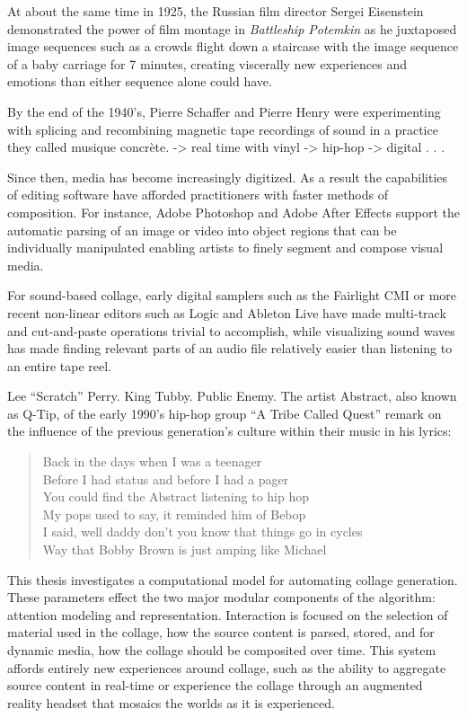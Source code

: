 At about the same time in 1925, the Russian film director Sergei Eisenstein demonstrated the power of film montage in \textit{Battleship Potemkin} as he juxtaposed image sequences such as a crowds flight down a staircase with the image sequence of a baby carriage for 7 minutes, creating viscerally new experiences and emotions than either sequence alone could have.  

By the end of the 1940's, Pierre Schaffer and Pierre Henry were experimenting with splicing and recombining magnetic tape recordings of sound in a practice they called musique concr\`ete.  -> real time with vinyl -> hip-hop -> digital . . .

Since then, media has become increasingly digitized.  As a result the capabilities of editing software have afforded practitioners with faster methods of composition.  For instance, Adobe Photoshop and Adobe After Effects support the automatic parsing of an image or video into object regions that can be individually manipulated enabling artists to finely segment and compose visual media.  

For sound-based collage, early digital samplers such as the Fairlight CMI or more recent non-linear editors such as Logic and Ableton Live have made multi-track and cut-and-paste operations trivial to accomplish, while visualizing sound waves has made finding relevant parts of an audio file relatively easier than listening to an entire tape reel.  

Lee ``Scratch'' Perry.  King Tubby.  Public Enemy.  The artist Abstract, also known as Q-Tip, of the early 1990's hip-hop group ``A Tribe Called Quest'' remark on the influence of the previous generation's culture within their music in his lyrics: 
\begin{quotation}
Back in the days when I was a teenager \\
Before I had status and before I had a pager \\
You could find the Abstract listening to hip hop \\
My pops used to say, it reminded him of Bebop \\
I said, well daddy don't you know that things go in cycles \\
Way that Bobby Brown is just amping like Michael \\
\end{quotation}

This thesis investigates a computational model for automating collage generation.  These parameters effect the two major modular components of the algorithm: attention modeling and representation.   Interaction is focused on the selection of material used in the collage, how the source content is parsed, stored, and for dynamic media, how the collage should be composited over time.  This system affords entirely new experiences around collage, such as the ability to aggregate source content in real-time or experience the collage through an augmented reality headset that mosaics the worlds as it is experienced.  

